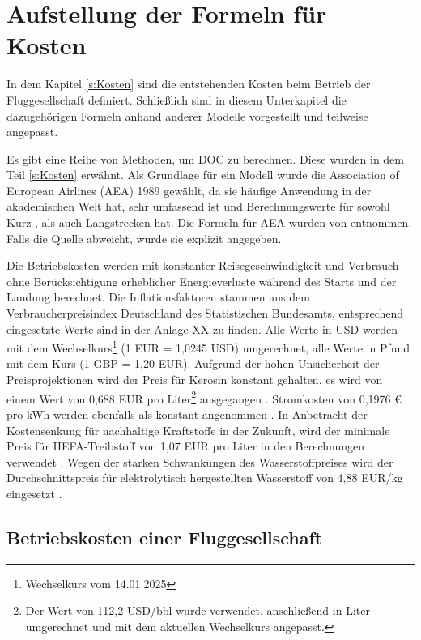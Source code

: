 \section{Aufstellung der Formeln für Kosten}
\label{s:Aufstellung der Formeln für Kosten}

In dem Kapitel \ref{s:Kosten} sind die entstehenden Kosten beim Betrieb der Fluggesellschaft definiert.
Schließlich sind in diesem Unterkapitel die dazugehörigen Formeln anhand anderer Modelle vorgestellt und teilweise angepasst. 

Es gibt eine Reihe von Methoden, um DOC zu berechnen. 
Diese wurden in dem Teil \ref{s:Kosten} erwähnt.
Als Grundlage für ein Modell wurde die Association of European Airlines (AEA) 1989 gewählt, 
da sie häufige Anwendung in der akademischen Welt hat, 
sehr umfassend ist und Berechnungswerte für sowohl Kurz-, als auch Langstrecken hat. 
Die Formeln für AEA wurden von \cite{} entnommen.
Falls die Quelle abweicht, wurde sie explizit angegeben. %

Die Betriebskosten werden mit konstanter Reisegeschwindigkeit und Verbrauch ohne 
Berücksichtigung erheblicher Energieverluste während des Starts und der Landung berechnet. 
Die Inflationsfaktoren stammen aus dem Verbraucherpreisindex Deutschland des Statistischen Bundesamts, 
entsprechend eingesetzte Werte sind in der Anlage XX zu finden. %
Alle Werte in USD werden mit dem Wechselkurs\footnote{Wechselkurs vom 14.01.2025} (1 EUR = 1,0245 USD)
umgerechnet, alle Werte in Pfund mit dem Kurs (1 GBP = 1,20 EUR).
Aufgrund der hohen Unsicherheit der Preisprojektionen wird der Preis für Kerosin 
konstant gehalten, es wird von einem Wert von 0,688 EUR pro Liter\footnote{Der Wert von 112,2 USD/bbl 
wurde verwendet, anschließend in Liter umgerechnet und mit dem aktuellen Wechselkurs angepasst.} 
ausgegangen \cite{iata_industry_statistics_2024}. 
Stromkosten von 0,1976 € pro kWh werden ebenfalls als konstant angenommen \cite{eurostat_nrg_pc_205}.
In Anbetracht der Kostensenkung für nachhaltige Kraftstoffe in der Zukunft, 
wird der minimale Preis für HEFA-Treibstoff von 1,07 EUR pro Liter in den Berechnungen verwendet \cite{watson2024sustainable}.
Wegen der starken Schwankungen des Wasserstoffpreises wird der Durchschnittspreis für 
elektrolytisch hergestellten Wasserstoff von 4,88 EUR/kg eingesetzt \cite{hoelzen2022hydrogen}.
%
%
\subsection{Betriebskosten einer Fluggesellschaft}

